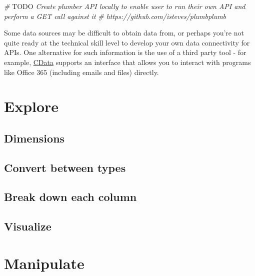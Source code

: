 \documentclass[
]{book}
\newenvironment{Shaded}{\begin{snugshade}}{\end{snugshade}}
\newcommand{\AlertTok}[1]{\textcolor[rgb]{0.94,0.16,0.16}{#1}}
\newcommand{\CommentTok}[1]{\textcolor[rgb]{0.56,0.35,0.01}{\textit{#1}}}
\begin{document}
\begin{Shaded}
\begin{Highlighting}[]
\CommentTok{# }\AlertTok{TODO}\CommentTok{ Create plumber API locally to enable user to run their own API and perform a GET call against it}
\CommentTok{# https://github.com/isteves/plumbplumb}
\end{Highlighting}
\end{Shaded}

Some data sources may be difficult to obtain data from, or perhaps you're not quite ready at the technical skill level to develop your own data connectivity for APIs. One alternative for such information is the use of a third party tool - for example, \href{https://www.cdata.com/kb/tech/office365-jdbc-r.rst}{CData} supports an interface that allows you to interact with programs like Office 365 (including emails and files) directly.

\hypertarget{explore}{%
\chapter{Explore}\label{explore}}

\hypertarget{dimensions}{%
\section{Dimensions}\label{dimensions}}

\hypertarget{convert-between-types}{%
\section{Convert between types}\label{convert-between-types}}

\hypertarget{break-down-each-column}{%
\section{Break down each column}\label{break-down-each-column}}

\hypertarget{visualize}{%
\section{Visualize}\label{visualize}}

\hypertarget{manipulate}{%
\chapter{Manipulate}\label{manipulate}}
\end{document}
